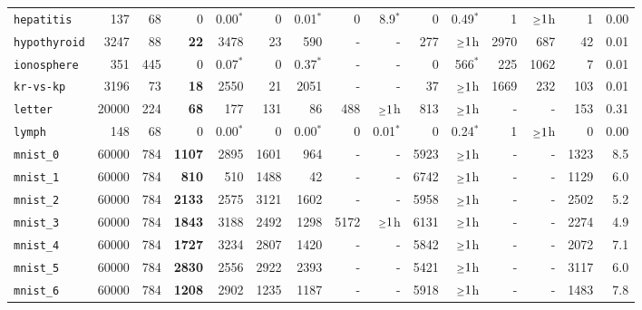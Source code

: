 \begin{tabular}{lccrrrrrrrrrrrr}
\texttt{hepatitis} & \multicolumn{1}{r}{137} & \multicolumn{1}{r}{68}  & 0 & 0.00$^*$ & 0 & 0.01$^*$ & 0 & 8.9$^*$ & 0 & 0.49$^*$ & 1 & $\mathsmaller{\geq}1$h & 1 & 0.00\\
\texttt{hypothyroid} & \multicolumn{1}{r}{3247} & \multicolumn{1}{r}{88}  & \textbf{22} & 3478 & 23 & 590 & - & - & 277 & $\mathsmaller{\geq}1$h & 2970 & 687 & 42 & 0.01\\
\texttt{ionosphere} & \multicolumn{1}{r}{351} & \multicolumn{1}{r}{445}  & 0 & 0.07$^*$ & 0 & 0.37$^*$ & - & - & 0 & 566$^*$ & 225 & 1062 & 7 & 0.01\\
\texttt{kr-vs-kp} & \multicolumn{1}{r}{3196} & \multicolumn{1}{r}{73}  & \textbf{18} & 2550 & 21 & 2051 & - & - & 37 & $\mathsmaller{\geq}1$h & 1669 & 232 & 103 & 0.01\\
\texttt{letter} & \multicolumn{1}{r}{20000} & \multicolumn{1}{r}{224}  & \textbf{68} & 177 & 131 & 86 & 488 & $\mathsmaller{\geq}1$h & 813 & $\mathsmaller{\geq}1$h & - & - & 153 & 0.31\\
\texttt{lymph} & \multicolumn{1}{r}{148} & \multicolumn{1}{r}{68}  & 0 & 0.00$^*$ & 0 & 0.00$^*$ & 0 & 0.01$^*$ & 0 & 0.24$^*$ & 1 & $\mathsmaller{\geq}1$h & 0 & 0.00\\
\texttt{mnist\_0} & \multicolumn{1}{r}{60000} & \multicolumn{1}{r}{784}  & \textbf{1107} & 2895 & 1601 & 964 & - & - & 5923 & $\mathsmaller{\geq}1$h & - & - & 1323 & 8.5\\
\texttt{mnist\_1} & \multicolumn{1}{r}{60000} & \multicolumn{1}{r}{784}  & \textbf{810} & 510 & 1488 & 42 & - & - & 6742 & $\mathsmaller{\geq}1$h & - & - & 1129 & 6.0\\
\texttt{mnist\_2} & \multicolumn{1}{r}{60000} & \multicolumn{1}{r}{784}  & \textbf{2133} & 2575 & 3121 & 1602 & - & - & 5958 & $\mathsmaller{\geq}1$h & - & - & 2502 & 5.2\\
\texttt{mnist\_3} & \multicolumn{1}{r}{60000} & \multicolumn{1}{r}{784}  & \textbf{1843} & 3188 & 2492 & 1298 & 5172 & $\mathsmaller{\geq}1$h & 6131 & $\mathsmaller{\geq}1$h & - & - & 2274 & 4.9\\
\texttt{mnist\_4} & \multicolumn{1}{r}{60000} & \multicolumn{1}{r}{784}  & \textbf{1727} & 3234 & 2807 & 1420 & - & - & 5842 & $\mathsmaller{\geq}1$h & - & - & 2072 & 7.1\\
\texttt{mnist\_5} & \multicolumn{1}{r}{60000} & \multicolumn{1}{r}{784}  & \textbf{2830} & 2556 & 2922 & 2393 & - & - & 5421 & $\mathsmaller{\geq}1$h & - & - & 3117 & 6.0\\
\texttt{mnist\_6} & \multicolumn{1}{r}{60000} & \multicolumn{1}{r}{784}  & \textbf{1208} & 2902 & 1235 & 1187 & - & - & 5918 & $\mathsmaller{\geq}1$h & - & - & 1483 & 7.8\\

\end{tabular}
